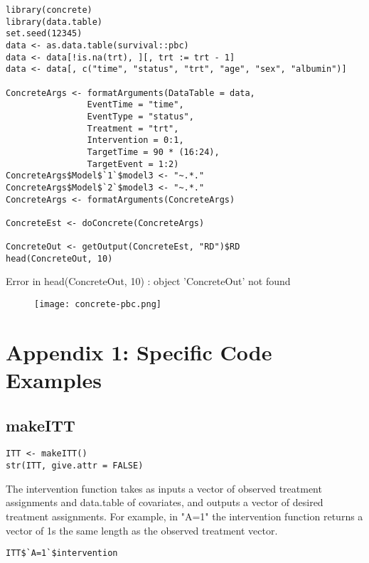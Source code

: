 \documentclass{report}
\newcommand{\1}{\ensuremath{\mathbf{1}}}
\begin{document}
\begin{lstlisting}
library(concrete)
library(data.table)
set.seed(12345)
data <- as.data.table(survival::pbc)
data <- data[!is.na(trt), ][, trt := trt - 1]
data <- data[, c("time", "status", "trt", "age", "sex", "albumin")]

ConcreteArgs <- formatArguments(DataTable = data,
				EventTime = "time",
				EventType = "status",
				Treatment = "trt",
				Intervention = 0:1,
				TargetTime = 90 * (16:24),
				TargetEvent = 1:2)
ConcreteArgs$Model$`1`$model3 <- "~.*."
ConcreteArgs$Model$`2`$model3 <- "~.*."
ConcreteArgs <- formatArguments(ConcreteArgs)

ConcreteEst <- doConcrete(ConcreteArgs)

ConcreteOut <- getOutput(ConcreteEst, "RD")$RD
head(ConcreteOut, 10)
\end{lstlisting}

Error in head(ConcreteOut, 10) : object 'ConcreteOut' not found

\begin{figure}[H]
\texttt{[image: concrete-pbc.png]}
\end{figure}

\section{Appendix 1: Specific Code Examples}
\label{sec:org0142855}
\subsection{makeITT}
\label{sec:org7539e9c}

\begin{lstlisting}
ITT <- makeITT()
str(ITT, give.attr = FALSE)
\end{lstlisting}

The intervention function takes as inputs a vector of observed treatment assignments and data.table of covariates, and outputs a vector of desired treatment assignments. For example, in "A=1" the intervention function returns a vector of 1s the same length as the observed treatment vector.

\begin{lstlisting}
ITT$`A=1`$intervention
\end{lstlisting}
\end{document}
